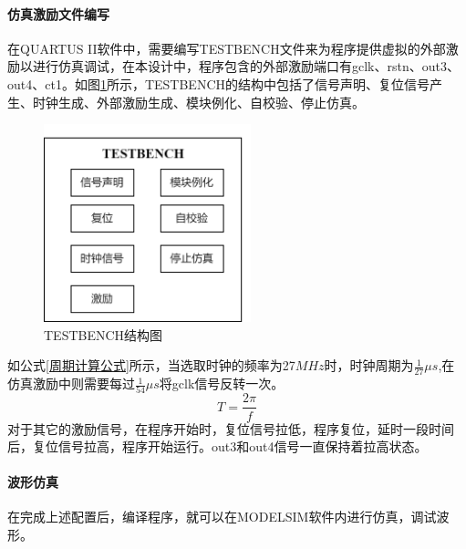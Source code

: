     \paragraph{仿真激励文件编写}
    在QUARTUS II软件中，需要编写TESTBENCH文件来为程序提供虚拟的外部激励以进行仿真调试，在本设计中，程序包含的外部激励端口有gclk、rstn、out3、out4、ct1。如图\ref{TESTBENCH结构图}所示，TESTBENCH的结构中包括了信号声明、复位信号产生、时钟生成、外部激励生成、模块例化、自校验、停止仿真。\par
    \begin{figure}[ht]
        \centering
        \includegraphics[width=6cm]{figure/TESTBENCH structure.png}
        \caption{TESTBENCH结构图}
        \label{TESTBENCH结构图}
    \end{figure}
    如公式\ref{周期计算公式}所示，当选取时钟的频率为27$MHz$时，时钟周期为$\frac{1}{27}\mu s$,在仿真激励中则需要每过$\frac{1}{54}
   \mu s$将gclk信号反转一次。
    \begin{equation}
        T=\frac{2\pi}{f}
        \label{周期计算公式}
    \end{equation}
    对于其它的激励信号，在程序开始时，复位信号拉低，程序复位，延时一段时间后，复位信号拉高，程序开始运行。out3和out4信号一直保持着拉高状态。
	

    \paragraph{波形仿真}
    在完成上述配置后，编译程序，就可以在MODELSIM软件内进行仿真，调试波形。
    
